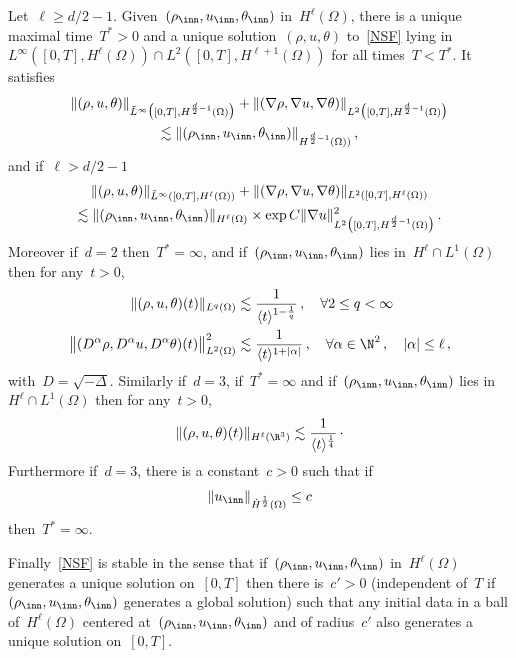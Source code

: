\begin{prop}\label{propNSF}
Let~$\ell \geq d/2-1$. Given~$ (\rho_{\inn},u_{\inn},\theta_{\inn}) $ in~$ H^\ell(\Omega)$, there is a unique maximal time~$T^*>0$ and a unique solution~$ (\rho,u,\theta) $ to~\eqref{NSF} lying in~$ L^\infty([0,T],H^\ell(\Omega)) \cap L^2([0,T],H^{\ell+1}(\Omega))$ for all times~$T<T^*$. It satisfies
\begin{multline}\label{estimateH1/2}
\|(\rho,u,\theta) \|_{\tilde L^\infty\big([0,T],H^{\frac d2-1}(\Omega)\big)} + \|(\nabla\rho,\nabla u,\nabla\theta) \|_{L^2\big([0,T],H^{\frac d2-1}(\Omega)\big) } \\
\lesssim \| (\rho_{\inn},u_{\inn},\theta_{\inn})\|_{H^{\frac d2-1}(\Omega))}\,,
\end{multline}
and if~$\ell>d/2-1$
\begin{multline}\label{estimateHell}
\|(\rho,u,\theta) \|_{\tilde L^\infty([0,T],H^\ell(\Omega)) } + \|(\nabla\rho,\nabla u,\nabla\theta) \|_{L^2([0,T],H^\ell(\Omega)) } \\
\lesssim \| (\rho_{\inn},u_{\inn},\theta_{\inn})\|_{H^\ell(\Omega)} \times \exp C \|\nabla u\|^2_{L^2\big([0,T], H^{\frac d2-1}(\Omega)\big) } \,.
\end{multline}
Moreover if~$d=2$ then~$T^*=\infty$, and if~$ (\rho_{\inn},u_{\inn},\theta_{\inn}) $ lies in~$H^\ell\cap L^1(\Omega)$ then for any~$t >0$,
\begin{align*}
\|(\rho,u,\theta)(t)\|_{L^q(\Omega) } &\lesssim \frac{1}{\langle t \rangle^{1-\frac1q}} \,, \quad \forall 2 \le q < \infty
\\
\big\|(D^\alpha \rho,D^\alpha u,D^\alpha \theta)(t)\big \|^2_{L^2(\Omega) }& \lesssim \frac{1}{\langle t \rangle^{1+|\alpha|}} \,, \quad \forall \alpha \in \N^2 \,, \quad |\alpha| \le \ell \,,
\end{align*}
with~$D = \sqrt{-\Delta}$. Similarly if~$d=3$, if~$T^*=\infty$ and if~$ (\rho_{\inn},u_{\inn},\theta_{\inn}) $ lies in~$H^\ell\cap L^1(\Omega)$ then for any~$t >0$,
\[
\|(\rho,u,\theta) (t)\|_{H^\ell(\R^3)} \lesssim \frac{1}{\langle t \rangle^{\frac14}}\, \cdotp
\]
Furthermore if~$d=3$, there is a constant~$c>0$ such that if
\[
\|u_{\inn}\|_{\dot H ^{\frac 12 }(\Omega)} \leq c
\]
then~$T^*=\infty$.


Finally~\eqref{NSF} is stable in the sense that if~$ (\rho_{\inn},u_{\inn},\theta_{\inn}) $ in~$ H^\ell(\Omega)$ generates a unique solution on~$[0,T]$ then there is~$c'>0$ (independent of~$T$ if~$ (\rho_{\inn},u_{\inn},\theta_{\inn}) $ generates a global solution) such that any initial data in a ball of~$ H^\ell(\Omega)$ centered at~$ (\rho_{\inn},u_{\inn},\theta_{\inn}) $ and of radius~$c'$ also generates a unique solution on~$[0,T]$.
\end{prop}

